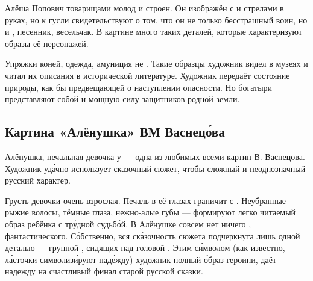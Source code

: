 Алёша Попович  товарищами молод и строен. Он изображён с  и стрелами в руках, но  к  гусли свидетельствуют о том, что он не только бесстрашный воин, но и , песенник, весельчак. В картине много таких деталей, которые характеризуют образы её персонажей.

Упряжки коней, одежда, амуниция не . Такие образцы художник видел в музеях и читал их описания в исторической литературе. Художник  передаёт состояние природы, как бы предвещающей о наступлении опасности. Но богатыри представляют собой  и мощную силу защитников родной земли.




\subsection{Картина «Алёнушка» ВМ Васнец\'{о}ва}

Алёнушка, печальная девочка у  --- одна из любимых всеми картин В. Васнецова. Художник уд\'{а}чно использует сказочный сюжет, чтобы  сложный и неоднозначный русский характер.

Грусть девочки очень взрослая. Печаль в её глазах граничит с . Неубранные рыжие волосы, тёмные глаза, нежно-алые губы --- формируют легко читаемый образ ребёнка с тр\'{у}дной судьб\'{о}й.
В Алёнушке совсем нет ничего , фантастического.
С\'{о}бственно, вся ск\'{а}зочность сюжета подчеркнута лишь одной деталью --- группой , сидящих над головой . Этим с\'{и}мволом (как известно, л\'{а}сточки символиз\'{и}руют над\'{е}жду) художник  полный  \'{о}браз героини, даёт надежду на счастливый финал старой русской сказки.

